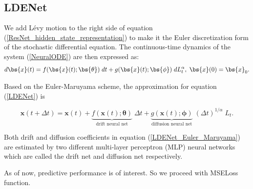 \subsection{LDENet}

We add Lévy motion to the right side of equation (\ref{ResNet_hidden_state_representation}) to make it the Euler discretization form of the stochastic differential equation. The continuous-time dynamics of the system (\ref{NeuralODE}) are then expressed as:
\begin{equation}\label{LDENet}
d\bs{x}(t) = f(\bs{x}(t); \bs{\theta}) \; dt + g(\bs{x}(t); \bs{\phi}) \; dL_t^{\alpha}, \; \bs{x}(0) = \bs{x}_0.
\end{equation}

Based on the Euler-Maruyama scheme, the approximation for equation (\ref{LDENet}) is

\begin{equation}\label{LDENet_Euler_Maruyama}
\boldsymbol{x}(t+\Delta t) = \boldsymbol{x}(t)+ \underbrace{f(\boldsymbol{x}(t); \boldsymbol{\theta})}_{\text{drift neural net}} \; \Delta t + \underbrace{g(\boldsymbol{x}(t); \boldsymbol{\phi})}_{\text{diffusion neural net}} \; (\Delta t)^{1 / \alpha} \; L_t.
\end{equation}

Both drift and diffusion coefficients in equation (\ref{LDENet_Euler_Maruyama}) are estimated by two different multi-layer
perceptron (MLP) neural networks which are called the drift net and diffusion net respectively. \cite{yang2022neuralnetworkstochasticdifferential}

As of now, predictive performance is of interest. So we proceed with MSELoss function.
\clearpage